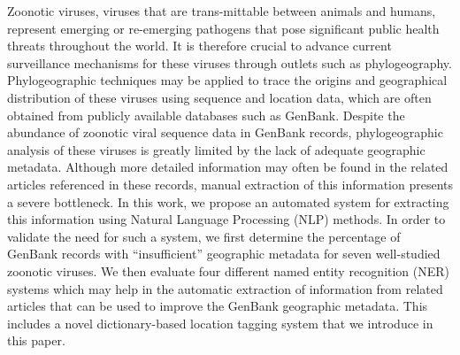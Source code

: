 Zoonotic viruses, viruses that are trans-mittable between animals and humans, represent emerging or re-emerging pathogens that pose significant public health threats throughout the world. It is therefore crucial to advance current surveillance mechanisms for these viruses through outlets such as phylogeography. Phylogeographic techniques may be applied to trace the origins and geographical distribution of these viruses using sequence and location data, which are often obtained from publicly available databases such as GenBank. Despite the abundance of zoonotic viral sequence data in GenBank records, phylogeographic analysis of these viruses is greatly limited by the lack of adequate geographic metadata. Although more detailed information may often be found in the related articles referenced in these records, manual extraction of this information presents a severe bottleneck. In this work, we propose an automated system for extracting this information using Natural Language Processing (NLP) methods. In order to validate the need for such a system, we first determine the percentage of GenBank records with ``insufficient'' geographic metadata for seven well-studied zoonotic viruses. We then evaluate four different named entity recognition (NER) systems which may help in the automatic extraction of information from related articles that can be used to improve the GenBank geographic metadata. This includes a novel dictionary-based location tagging system that we introduce in this paper.

